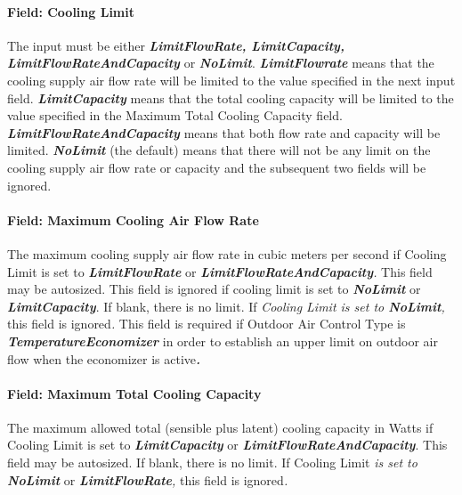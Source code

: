 \paragraph{Field: Cooling Limit}\label{field-cooling-limit-000}

The input must be either \textbf{\emph{LimitFlowRate, LimitCapacity, LimitFlowRateAndCapacity}} or \textbf{\emph{NoLimit}}. \textbf{\emph{LimitFlowrate}} means that the cooling supply air flow rate will be limited to the value specified in the next input field. \textbf{\emph{LimitCapacity}} means that the total cooling capacity will be limited to the value specified in the Maximum Total Cooling Capacity field. \textbf{\emph{LimitFlowRateAndCapacity}} means that both flow rate and capacity will be limited. \textbf{\emph{NoLimit}} (the default) means that there will not be any limit on the cooling supply air flow rate or capacity and the subsequent two fields will be ignored.

\paragraph{Field: Maximum Cooling Air Flow Rate}\label{field-maximum-cooling-air-flow-rate-001}

The maximum cooling supply air flow rate in cubic meters per second if Cooling Limit is set to \textbf{\emph{LimitFlowRate}} or \textbf{\emph{LimitFlowRateAndCapacity}}\emph{.} This field may be autosized. This field is ignored if cooling limit is set to \textbf{\emph{NoLimit}} or \textbf{\emph{LimitCapacity}}. If blank, there is no limit. If \emph{Cooling Limit is set to \textbf{NoLimit},} this field is ignored\emph{.} This field is required if Outdoor Air Control Type is \textbf{\emph{TemperatureEconomizer}} in order to establish an upper limit on outdoor air flow when the economizer is active\textbf{\emph{.}}

\paragraph{Field: Maximum Total Cooling Capacity}\label{field-maximum-total-cooling-capacity-000}

The maximum allowed total (sensible plus latent) cooling capacity in Watts if Cooling Limit is set to \textbf{\emph{LimitCapacity}} or \textbf{\emph{LimitFlowRateAndCapacity}}. This field may be autosized. If blank, there is no limit. If Cooling Limit \emph{is set to \textbf{NoLimit}} or \textbf{\emph{LimitFlowRate}}\emph{,} this field is ignored\emph{.}

